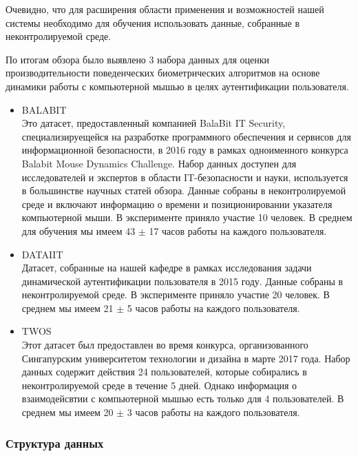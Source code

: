 \documentclass[12pt]{article}
\begin{document}
    \par Очевидно, что для расширения области применения и возможностей нашей системы необходимо для обучения использовать данные, собранные в неконтролируемой среде.

    \par По итогам обзора было выявлено 3 набора данных для оценки производительности поведенческих биометрических алгоритмов на основе динамики работы с компьютерной мышью в целях аутентификации пользователя.

    \begin{itemize}
        \item \textsc{BALABIT} \cite{BALABIT} \\
        Это датасет, предоставленный компанией BalaBit IT Security, специализируещейся на разработке программного обеспечения и сервисов для информационной безопасности, в 2016 году в рамках одноименного конкурса Balabit Mouse Dynamics Challenge. Набор данных доступен для исследователей и экспертов в области IT-безопасности и науки, используется в большинстве научных статей обзора. Данные собраны в неконтролируемой среде и включают информацию о времени и позиционировании указателя компьютерной мыши. В эксперименте приняло участие 10 человек. В среднем для обучения мы имеем 43 $\pm$ 17 часов работы на каждого пользователя.

        \item \textsc{DATAIIT} \\
        Датасет, собранные на нашей кафедре в рамках исследования задачи динамической аутентификации пользователя в 2015 году. Данные собраны в неконтролируемой среде. В эксперименте приняло участие 20 человек. В среднем мы имеем 21 $\pm$ 5 часов работы на каждого пользователя.

        \item \textsc{TWOS} \cite{TWOS} \\
        Этот датасет был предоставлен во время конкурса, организованного Сингапурским университетом технологии и дизайна в марте 2017 года. Набор данных содержит действия 24 пользователей, которые собирались в неконтролируемой среде в течение 5 дней. Однако информация о взаимодейсвтии с компьютерной мышью есть только для 4 пользователей. В среднем мы имеем 20 $\pm$ 3 часов работы на каждого пользователя.
    \end{itemize}


    \subsubsection{Структура данных}
    \label{sec:Research:Data:Struct}
    
\end{document}
